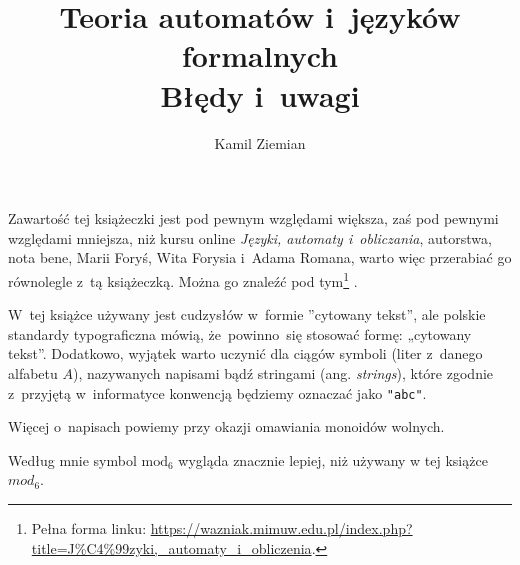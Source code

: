\documentclass[a4paper,11pt]{article}
\title{Teoria automatów i~języków formalnych \\
  Błędy i~uwagi}
\author{Kamil Ziemian}
\begin{document}





\maketitle %









\start Zawartość tej książeczki jest pod pewnym względami większa, zaś
pod pewnymi względami mniejsza, niż kursu online \textit{Języki,
  automaty i~obliczania}, autorstwa, nota bene, Marii Foryś, Wita
Forysia i~Adama Romana, warto więc przerabiać go równolegle z~tą
książeczką. Można go znaleźć pod tym\footnote{Pełna forma linku:
  \href{https://wazniak.mimuw.edu.pl/index.php?title=J\%C4\%99zyki,\_automaty\_i\_obliczenia}
  {https://wazniak.mimuw.edu.pl/index.php?title=J\%C4\%99zyki,\_automaty\_i\_obliczenia}.}
.

\vspace{\spaceFour}



\start W~tej książce używany jest cudzysłów w~formie ”cytowany tekst”,
ale polskie standardy typograficzna mówią, że~powinno~się stosować
formę: „cytowany tekst”. Dodatkowo, wyjątek warto uczynić dla ciągów
symboli (liter z~danego alfabetu $A$), nazywanych napisami bądź
stringami (ang. \textit{strings}), które zgodnie z~przyjętą
w~informatyce konwencją będziemy oznaczać jako \texttt{"abc"}.

Więcej o~napisach powiemy przy okazji omawiania monoidów wolnych.






\start {} Według mnie symbol $\textrm{mod}_{ 6 }$ wygląda
znacznie lepiej, niż używany w tej książce $mod_{ 6 }$.
\end{document}
